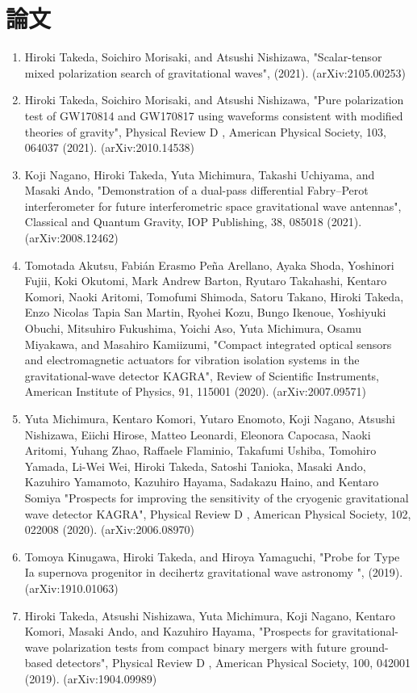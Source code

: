 \documentclass[uplatex, 12pt,a4paper]{jsarticle}
\begin{document}
\section*{論文}
\begin{enumerate}
   \item Hiroki Takeda, Soichiro Morisaki, and Atsushi Nishizawa, "Scalar-tensor mixed polarization search of gravitational waves", (2021). (arXiv:2105.00253)
   \item Hiroki Takeda, Soichiro Morisaki, and Atsushi Nishizawa, "Pure polarization test of GW170814 and GW170817 using waveforms consistent with modified theories of gravity", Physical Review D , American Physical Society, 103, 064037 (2021). (arXiv:2010.14538)
   \item Koji Nagano, Hiroki Takeda, Yuta Michimura, Takashi Uchiyama, and Masaki Ando, "Demonstration of a dual-pass differential Fabry–Perot interferometer for future interferometric space gravitational wave antennas", Classical and Quantum Gravity, IOP Publishing, 38, 085018 (2021). (arXiv:2008.12462)
\item Tomotada Akutsu, Fabián Erasmo Peña Arellano, Ayaka Shoda, Yoshinori Fujii, Koki Okutomi, Mark Andrew Barton, Ryutaro Takahashi, Kentaro Komori, Naoki Aritomi, Tomofumi Shimoda, Satoru Takano, Hiroki Takeda, Enzo Nicolas Tapia San Martin, Ryohei Kozu, Bungo Ikenoue, Yoshiyuki Obuchi, Mitsuhiro Fukushima, Yoichi Aso, Yuta Michimura, Osamu Miyakawa, and Masahiro Kamiizumi, "Compact integrated optical sensors and electromagnetic actuators for vibration isolation systems in the gravitational-wave detector KAGRA", Review of Scientific Instruments, American Institute of Physics, 91, 115001 (2020). (arXiv:2007.09571)
\item Yuta Michimura, Kentaro Komori, Yutaro Enomoto, Koji Nagano, Atsushi Nishizawa, Eiichi Hirose, Matteo Leonardi, Eleonora Capocasa, Naoki Aritomi, Yuhang Zhao, Raffaele Flaminio, Takafumi Ushiba, Tomohiro Yamada, Li-Wei Wei, Hiroki Takeda, Satoshi Tanioka, Masaki Ando, Kazuhiro Yamamoto, Kazuhiro Hayama, Sadakazu Haino, and Kentaro Somiya "Prospects for improving the sensitivity of the cryogenic gravitational wave detector KAGRA", Physical Review D , American Physical Society, 102, 022008 (2020). (arXiv:2006.08970)
\item Tomoya Kinugawa, Hiroki Takeda, and Hiroya Yamaguchi, "Probe for Type Ia supernova progenitor in decihertz gravitational wave astronomy ", (2019).\\ (arXiv:1910.01063)
\item Hiroki Takeda, Atsushi Nishizawa, Yuta Michimura, Koji Nagano, Kentaro Komori, Masaki Ando, and Kazuhiro Hayama, "Prospects for gravitational-wave polarization tests from compact binary mergers with future ground-based detectors", Physical Review D , American Physical Society, 100, 042001 (2019). (arXiv:1904.09989)

\end{enumerate}
\end{document}
